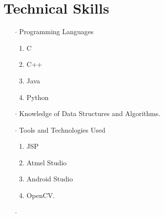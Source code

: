\documentclass[12pt]{article}
\begin{document}
\section*{Technical Skills}
\begin{itemize}
\item[$\cdot$]Programming Languages
\begin{enumerate}
\item C
\item C++
\item Java
\item Python
\end{enumerate}
\item[$\cdot$]Knowledge of Data Structures and Algorithms.
\item[$\cdot$]Tools and Technologies Used
\begin{enumerate}
\item JSP
\item Atmel Studio
\item Android Studio
\item OpenCV.
\end{enumerate}
\end{itemize}
\begin{itemize}
\item[$\cdot$]
\end{itemize}
\end{document}
